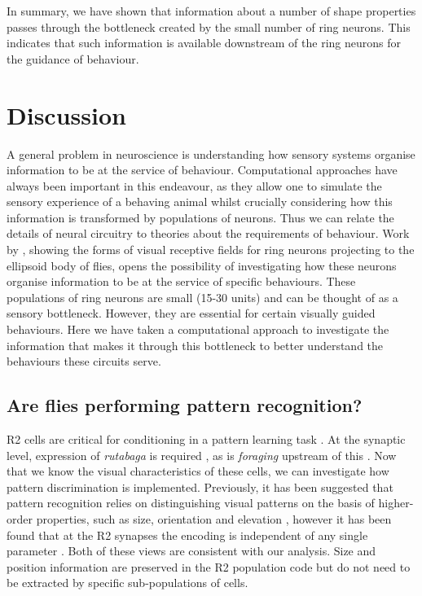 \documentclass[10pt]{article}
\begin{document}
In summary, we have shown that information about a number of shape properties passes through the bottleneck created by the small number of ring neurons.
This indicates that such information is available downstream of the ring neurons for the guidance of behaviour.

\section*{Discussion}
A general problem in neuroscience is understanding how sensory systems organise information to be at the service of behaviour. Computational approaches have always been important in this endeavour, as they allow one to simulate the sensory experience of a behaving animal whilst crucially considering how this information is transformed by populations of neurons. Thus we can relate the details of neural circuitry to theories about the requirements of behaviour.
Work by \cite{Seelig2013}, showing the forms of visual receptive fields for ring neurons projecting to the ellipsoid body of flies, opens the possibility of investigating how these neurons organise information to be at the service of specific behaviours. These populations of ring neurons are small (15-30 units) and can be thought of as a sensory bottleneck. However, they are essential for certain visually guided behaviours. Here we have taken a computational approach  to investigate the information that makes it through this bottleneck to better understand the behaviours these circuits serve.

\subsection*{Are flies performing pattern recognition?}

R2 cells are critical for conditioning in a pattern learning task \cite{Pan2009}. At the synaptic level, expression of \emph{rutabaga} is required \cite{Pan2009}, as is \emph{foraging} upstream of this \cite{Wang2008}. Now that we know the visual characteristics of these cells, we can investigate how pattern discrimination is implemented. Previously, it has been suggested that pattern recognition relies on distinguishing visual patterns on the basis of higher-order properties, such as size, orientation and elevation \cite{Ernst1999,Pan2009}, however it has been found that at the R2 synapses the encoding is independent of any single parameter \cite{Liu2006}. Both of these views are consistent with our analysis. Size and position information are preserved in the R2 population code but do not need to be extracted by specific sub-populations of cells. 
\end{document}
